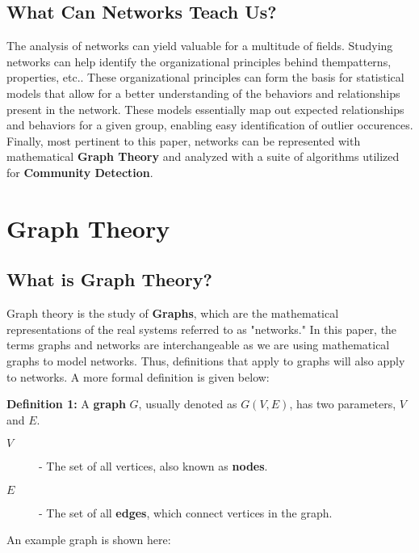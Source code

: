 \documentclass{article}
\begin{document}
\subsection{What Can Networks Teach Us?}
The analysis of networks can yield valuable for a multitude of fields. Studying networks can help identify the organizational principles behind them\textemdash patterns, properties, etc.. These organizational principles can form the basis for statistical models
that allow for a better understanding of the behaviors and relationships present in the network. These models essentially map out expected relationships and behaviors for a given group, enabling easy identification of outlier occurences. Finally, most pertinent to this paper,
networks can be represented with mathematical \textbf{Graph Theory} and analyzed with a suite of algorithms utilized for \textbf{Community Detection}.

\section{Graph Theory}

\subsection{What is Graph Theory?}
Graph theory is the study of \textbf{Graphs}, which are the mathematical representations of the real systems referred to as "networks." 
In this paper, the terms graphs and networks are interchangeable as we are using mathematical graphs to model networks. 
Thus, definitions that apply to graphs will also apply to networks. 
A more formal definition is given below: 

\bigskip

\noindent \textbf{Definition 1:} A \textbf{graph} $G$, usually denoted as $G(V, E)$, has two parameters, $V$ and $E$. 

\indent \begin{description}
  \item[\textbf{$V$}] - The set of all vertices, also known as \textbf{nodes}. 
  \item[\textbf{$E$}] - The set of all \textbf{edges}, which connect vertices in the graph. 
\end{description}

An example graph is shown here:

\bigskip
\end{document}
